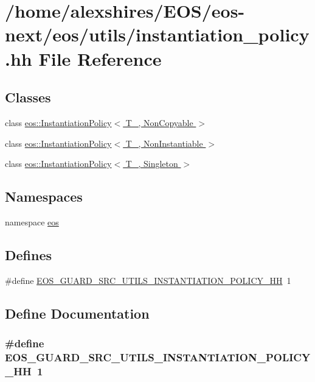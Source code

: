 \hypertarget{instantiation__policy_8hh}{
\section{/home/alexshires/EOS/eos-\/next/eos/utils/instantiation\_\-policy.hh File Reference}
\label{instantiation__policy_8hh}
}
\subsection*{Classes}
\begin{DoxyCompactItemize}
\item 
class \hyperlink{classeos_1_1InstantiationPolicy_3_01T___00_01NonCopyable_01_4}{eos::InstantiationPolicy$<$ T\_\-, NonCopyable $>$}
\item 
class \hyperlink{classeos_1_1InstantiationPolicy_3_01T___00_01NonInstantiable_01_4}{eos::InstantiationPolicy$<$ T\_\-, NonInstantiable $>$}
\item 
class \hyperlink{classeos_1_1InstantiationPolicy_3_01T___00_01Singleton_01_4}{eos::InstantiationPolicy$<$ T\_\-, Singleton $>$}
\end{DoxyCompactItemize}
\subsection*{Namespaces}
\begin{DoxyCompactItemize}
\item 
namespace \hyperlink{namespaceeos}{eos}
\end{DoxyCompactItemize}
\subsection*{Defines}
\begin{DoxyCompactItemize}
\item 
\#define \hyperlink{instantiation__policy_8hh_abd336977b5f10aab9894e0790cec50a3}{EOS\_\-GUARD\_\-SRC\_\-UTILS\_\-INSTANTIATION\_\-POLICY\_\-HH}~1
\end{DoxyCompactItemize}


\subsection{Define Documentation}
\hypertarget{instantiation__policy_8hh_abd336977b5f10aab9894e0790cec50a3}{
\subsubsection[{EOS\_\-GUARD\_\-SRC\_\-UTILS\_\-INSTANTIATION\_\-POLICY\_\-HH}]{\setlength{\rightskip}{0pt plus 5cm}\#define EOS\_\-GUARD\_\-SRC\_\-UTILS\_\-INSTANTIATION\_\-POLICY\_\-HH~1}}
\label{instantiation__policy_8hh_abd336977b5f10aab9894e0790cec50a3}
